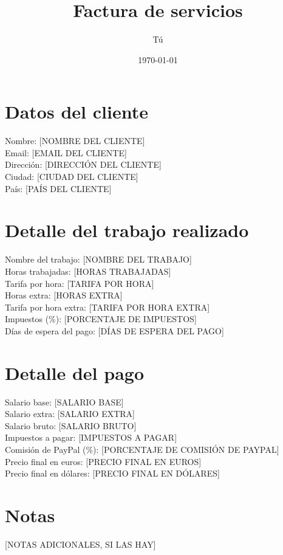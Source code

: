 \documentclass{article}
\title{Factura de servicios}
\author{Tú}
\date{\today}
\begin{document}
\maketitle

\section{Datos del cliente}
Nombre: [NOMBRE DEL CLIENTE] \\
Email: [EMAIL DEL CLIENTE] \\
Dirección: [DIRECCIÓN DEL CLIENTE] \\
Ciudad: [CIUDAD DEL CLIENTE] \\
País: [PAÍS DEL CLIENTE] \\

\section{Detalle del trabajo realizado}
Nombre del trabajo: [NOMBRE DEL TRABAJO] \\
Horas trabajadas: [HORAS TRABAJADAS] \\
Tarifa por hora: [TARIFA POR HORA] \\
Horas extra: [HORAS EXTRA] \\
Tarifa por hora extra: [TARIFA POR HORA EXTRA] \\
Impuestos (\%): [PORCENTAJE DE IMPUESTOS] \\
Días de espera del pago: [DÍAS DE ESPERA DEL PAGO] \\

\section{Detalle del pago}
Salario base: [SALARIO BASE] \\
Salario extra: [SALARIO EXTRA] \\
Salario bruto: [SALARIO BRUTO] \\
Impuestos a pagar: [IMPUESTOS A PAGAR] \\
Comisión de PayPal (\%): [PORCENTAJE DE COMISIÓN DE PAYPAL] \\
Precio final en euros: [PRECIO FINAL EN EUROS] \\
Precio final en dólares: [PRECIO FINAL EN DÓLARES] \\

\section{Notas}
[NOTAS ADICIONALES, SI LAS HAY]
\end{document}
